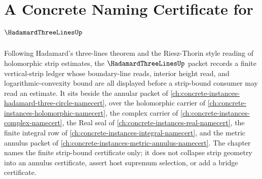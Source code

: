 \chapter{A Concrete Naming Certificate for $\HadamardThreeLinesUp$}
\label{ch:concrete-instances-hadamard-three-lines-namecert}

Following Hadamard's three-lines theorem and the Riesz-Thorin style reading of holomorphic strip estimates, the $\HadamardThreeLinesUp$ packet records a finite vertical-strip ledger whose boundary-line reads, interior height read, and logarithmic-convexity bound are all displayed before a strip-bound consumer may read an estimate. It sits beside the annular packet of \autoref{ch:concrete-instances-hadamard-three-circle-namecert}, over the holomorphic carrier of \autoref{ch:concrete-instances-holomorphic-namecert}, the complex carrier of \autoref{ch:concrete-instances-complex-namecert}, the Real seal of \autoref{ch:concrete-instances-real-namecert}, the finite integral row of \autoref{ch:concrete-instances-integral-namecert}, and the metric annulus packet of \autoref{ch:concrete-instances-metric-annulus-namecert}. The chapter names the finite strip-bound certificate only; it does not collapse strip geometry into an annulus certificate, assert host supremum selection, or add a bridge certificate.

